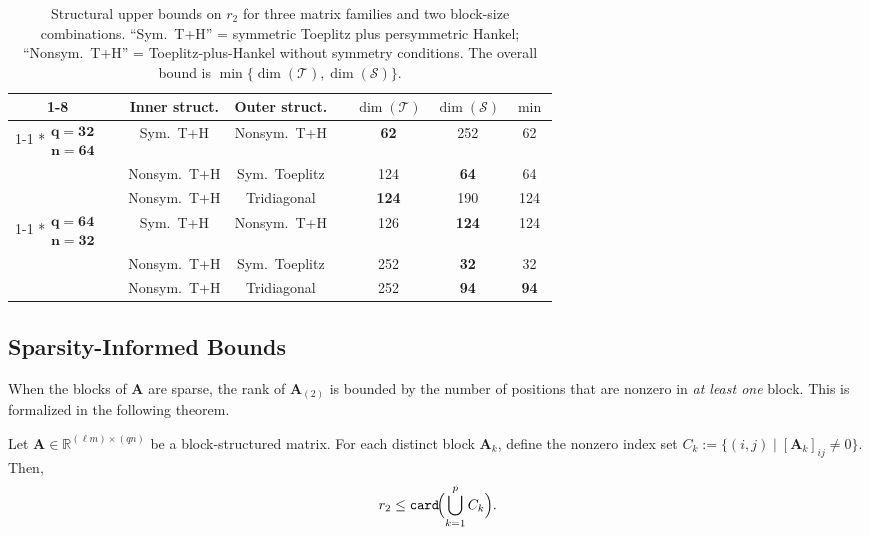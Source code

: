 \documentclass{siamart251216}
\newcommand{\RR}[2]{\mathbb{R}^{#1 \times #2}}
\newcommand{\munfold}[2]{\mathbf{#1}_{(#2)}}
\def\bA{\mathbf{A}}
\begin{document}
\begin{table}[t]
    \centering
    \begin{tabular}{c c c c c c c c}
    \cmidrule[1pt]{1-8}
    && \textbf{Inner struct.} & \textbf{Outer struct.}
       && $\dim(\mathscr{T})$ & $\dim(\mathscr{S})$ & $\min$\\
    \cmidrule{1-1}\cmidrule{3-4}\cmidrule{6-8}
    \multirow{3}*{$\begin{matrix}\mathbf{q=32}\\ \mathbf{n=64}\end{matrix}$}
    && Sym.\ T+H     & Nonsym.\ T+H && \textbf{62}  & 252 & 62\\
    && Nonsym.\ T+H  & Sym.\ Toeplitz && 124 & \textbf{64} & 64\\
    && Nonsym.\ T+H  & Tridiagonal   && \textbf{124} & 190 & 124\\
    \cmidrule{1-1}\cmidrule{3-4}\cmidrule{6-8}
    \multirow{3}*{$\begin{matrix}\mathbf{q=64}\\ \mathbf{n=32}\end{matrix}$}
    && Sym.\ T+H     & Nonsym.\ T+H && 126 & \textbf{124} & 124\\
    && Nonsym.\ T+H  & Sym.\ Toeplitz && 252 & \textbf{32} & 32\\
    && Nonsym.\ T+H  & Tridiagonal   && 252 & \textbf{94} & \textbf{94}\\
    \bottomrule
    \end{tabular}
    \caption{Structural upper bounds on $r_2$ for three matrix families and two block-size
    combinations.  ``Sym.\ T+H'' = symmetric Toeplitz plus persymmetric Hankel;
    ``Nonsym.\ T+H'' = Toeplitz-plus-Hankel without symmetry conditions.
    The overall bound is $\min\{\dim(\mathscr{T}),\dim(\mathscr{S})\}$.}
    \label{tab:estimate}
\end{table}

\subsection{Sparsity-Informed Bounds}
\label{subsec:sparsity}

When the blocks of $\bA$ are sparse, the rank of $\munfold{A}{2}$ is bounded by the number of
positions that are nonzero in \emph{at least one} block. This is formalized in the following theorem.

\begin{theorem}
\label{thm:sparse}
Let $\bA\in\RR{(\ell m)}{(qn)}$ be a block-structured matrix. For each distinct block $\bA_k$, define the nonzero index set
$C_k := \{(i,j)\mid[\bA_k]_{ij}\ne 0\}$. Then,
\begin{equation*}
    r_2 \le \mathtt{card}\!\Bigl(\bigcup_{k=1}^p C_k\Bigr).
\end{equation*}
\end{theorem}
\end{document}
